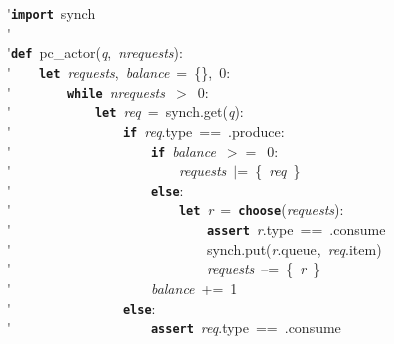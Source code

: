 \'\>\texttt{\textbf{import}}~synch\\

\'\>\\

\'\>\texttt{\textbf{def}}~pc\_actor(\textit{q},~\textit{nrequests}):\\

\'\>~~~~\texttt{\textbf{let}}~\textit{requests},~\textit{balance}~=~\{\},~0:\\

\'\>~~~~~~~~\texttt{\textbf{while}}~\textit{nrequests}~$>$~0:\\

\'\>~~~~~~~~~~~~\texttt{\textbf{let}}~\textit{req}~=~synch.get(\textit{q}):\\

\'\>~~~~~~~~~~~~~~~~\texttt{\textbf{if}}~\textit{req}.type~==~.produce:\\

\'\>~~~~~~~~~~~~~~~~~~~~\texttt{\textbf{if}}~\textit{balance}~$>=$~0:\\

\'\>~~~~~~~~~~~~~~~~~~~~~~~~\textit{requests}~$\vert$=~\{~\textit{req}~\}\\

\'\>~~~~~~~~~~~~~~~~~~~~\texttt{\textbf{else}}:\\

\'\>~~~~~~~~~~~~~~~~~~~~~~~~\texttt{\textbf{let}}~\textit{r}~=~\texttt{\textbf{choose}}(\textit{requests}):\\

\'\>~~~~~~~~~~~~~~~~~~~~~~~~~~~~\texttt{\textbf{assert}}~\textit{r}.type~==~.consume\\

\'\>~~~~~~~~~~~~~~~~~~~~~~~~~~~~synch.put(\textit{r}.queue,~\textit{req}.item)\\

\'\>~~~~~~~~~~~~~~~~~~~~~~~~~~~~\textit{requests}~--=~\{~\textit{r}~\}\\

\'\>~~~~~~~~~~~~~~~~~~~~\textit{balance}~+=~1\\

\'\>~~~~~~~~~~~~~~~~\texttt{\textbf{else}}:\\

\'\>~~~~~~~~~~~~~~~~~~~~\texttt{\textbf{assert}}~\textit{req}.type~==~.consume\\

